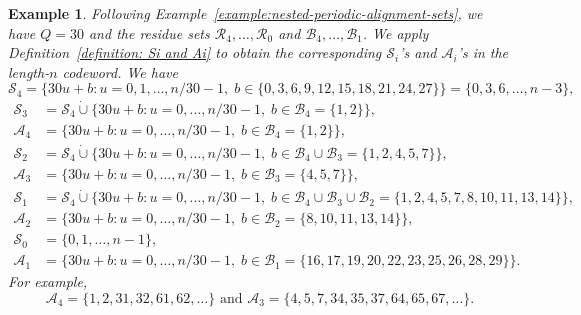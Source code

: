 \documentclass[journal,letterpaper,onecolumn,11pt]{IEEEtran}
\newcommand{\cA}{\mathcal{A}}
\newcommand{\cB}{\mathcal{B}}
\newcommand{\cR}{\mathcal{R}}
\newcommand{\cS}{\mathcal{S}}
\newtheorem{example}{Example}
\begin{document}
\begin{example}\label{example:full-position-sets}
Following Example~\ref{example:nested-periodic-alignment-sets}, we have
\(Q=30\) and the residue sets
\(\cR_4,\ldots,\cR_0\) and
\(\cB_4,\ldots,\cB_1\).
We apply Definition~\ref{definition: Si and Ai} to obtain the
corresponding $\cS_i$'s and $\cA_i$'s in the length-\(n\) codeword.
We have
\[
\cS_4
=
\{30u+b:
u=0,1,\ldots,n/30-1,\;
b\in\{0,3,6,9,12,15,18,21,24,27\}\}=\{0,3,6,\ldots,n-3\},
\]
\[
\begin{aligned}
\cS_3
&=\cS_4\mathbin{\dot\cup}
\{30u+b:
u=0,\ldots,n/30-1,\;
b\in\cB_4=\{1,2\}\},
&
\\
\cA_4
&=
\{30u+b:
u=0,\ldots,n/30-1,\;
b\in\cB_4=\{1,2\}\},
\\
\cS_2
&=\cS_4\mathbin{\dot\cup}
\{30u+b:
u=0,\ldots,n/30-1,\;
b\in\cB_4\cup\cB_3=\{1,2,4,5,7\}\},
&
\\
\cA_3
&=
\{30u+b:
u=0,\ldots,n/30-1,\;
b\in\cB_3=\{4,5,7\}\},
\\
\cS_1
&=\cS_4\mathbin{\dot\cup}
\{30u+b:
u=0,\ldots,n/30-1,\;
b\in\cB_4\cup\cB_3\cup\cB_2=\{1,2,4,5,7,8,10,11,13,14\}\},
&
\\
\cA_2
&=
\{30u+b:
u=0,\ldots,n/30-1,\;
b\in\cB_2=\{8,10,11,13,14\}\},
\\
\cS_0
&=\{0,1,\ldots,n-1\},
&
\\
\cA_1
&=
\{30u+b:
u=0,\ldots,n/30-1,\;
b\in\cB_1=\{16,17,19,20,22,23,25,26,28,29\}\}.
\end{aligned}
\]
For example,
\[
\cA_4=\{1,2,31,32,61,62,\ldots\}
\mbox{ and }
\cA_3=\{4,5,7,34,35,37,64,65,67,\ldots\}.
\]
\end{example}
\end{document}
